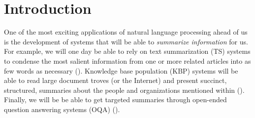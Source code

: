 
\chapter{\label{chap:intro} Introduction}

One of the most exciting applications of natural language processing ahead of us is the development of systems that will be able to \textit{summarize information} for us.
For example, we will one day be able to rely on 
text summarization (TS) systems to condense the most salient information from one or more related articles into as few words as necessary ().
Knowledge base population (KBP) systems  will be able to read large document troves (or the Internet) and present succinct, structured, summaries about the people and organizations mentioned within ().
Finally, we will be be able to get targeted summaries through open-ended question answering systems (OQA) ().

